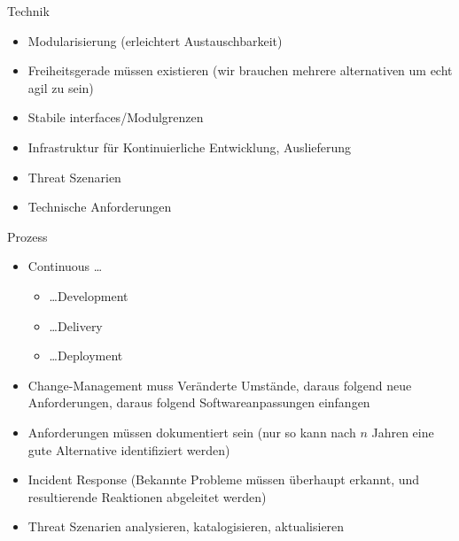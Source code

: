 
\begin{frame}{Technik}
  \begin{itemize}
    \item Modularisierung (erleichtert Austauschbarkeit)
    \item Freiheitsgerade müssen existieren (wir brauchen mehrere alternativen um echt agil zu sein)
    \item Stabile interfaces/Modulgrenzen
    \item Infrastruktur für Kontinuierliche Entwicklung, Auslieferung
    \item Threat Szenarien
    \item Technische Anforderungen
  \end{itemize}
\end{frame}


\begin{frame}{Prozess}
  \begin{itemize}
    \item Continuous \ldots
    \begin{itemize}
      \item \dots Development
      \item \dots Delivery
      \item \dots Deployment
    \end{itemize}
    \item Change-Management muss Veränderte Umstände, daraus folgend neue Anforderungen, daraus folgend Softwareanpassungen einfangen
    \item Anforderungen müssen dokumentiert sein (nur so kann nach $n$ Jahren eine gute Alternative identifiziert werden)
    \item Incident Response (Bekannte Probleme müssen überhaupt erkannt, und resultierende Reaktionen abgeleitet werden)
    \item Threat Szenarien analysieren, katalogisieren, aktualisieren
  \end{itemize}
\end{frame}


